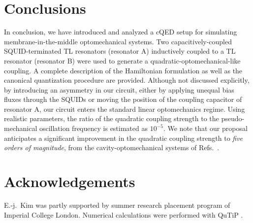 \documentclass[aps, twocolumn, prl, showpacs, superscriptaddress]{revtex4-1}
\begin{document}
\section{Conclusions}\label{sec:conclusion}
In conclusion, we have introduced and analyzed a cQED setup for simulating membrane-in-the-middle optomechanical systems. Two capacitively-coupled SQUID-terminated TL resonators (resonator A) inductively coupled to a TL resonator (resonator B) were used to generate a quadratic-optomechanical-like coupling. A complete description of the Hamiltonian formulation as well as the canonical quantization procedure are provided. Although not discussed explicitly, by introducing an asymmetry in our circuit, either by applying unequal bias fluxes through the SQUIDs or moving the position of the coupling capacitor of resonator A, our circuit enters the standard linear optomechanics regime. Using realistic parameters, the ratio of the quadratic coupling strength to the pseudo-mechanical oscillation frequency is estimated as $10^{-5}$. We note that our proposal anticipates a significant improvement in the quadratic coupling strength to \emph{five orders of magnitude}, from the cavity-optomechanical systems of Refs.~\cite{Thompson:2008dx, Jayich:2008iz, Sankey:2009vs, Sankey:2010ej}.

\section*{Acknowledgements}
E.-j.~Kim was partly supported by summer research placement program of Imperial College London. Numerical calculations were performed with QuTiP \cite{Johansson20121760, Johansson20131234}.


\end{document}
